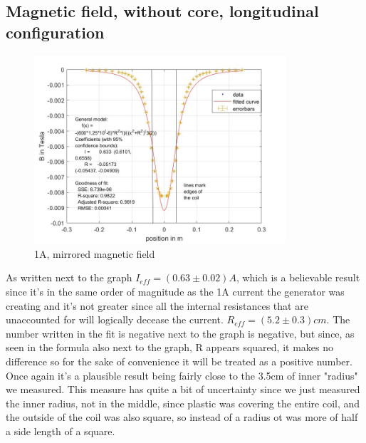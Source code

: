 \documentclass[12pt]{article}
\begin{document}
	\subsection{Magnetic field, without core, longitudinal configuration}
		\begin{figure}[H]
		\centering
		\includegraphics[height=7cm]{long 1A ohne Kern mit Spule.jpg}
		\caption{1A, mirrored magnetic field}
		\end{figure}
	As written next to the graph $I_{eff}=(0.63\pm 0.02)A$, which is a believable result since it's in the same order of magnitude as the 1A current the generator was creating and it's not greater since all the internal resistances that are unaccounted for will logically decease the current.
	$R_{eff}=(5.2\pm 0.3)cm$. The number written in the fit is negative next to the graph is negative, but since, as seen in the formula also next to the graph, R appears squared, it makes no difference so for the sake of convenience it will be treated as a positive number. Once again it's a plausible result being fairly close to the 3.5cm of inner "radius" we measured. This measure has quite a bit of uncertainty since we just measured the inner radius, not in the middle, since plastic was covering the entire coil, and the outside of the coil was also square, so instead of a radius ot was more of half a side length of a square. 
	
\end{document}
